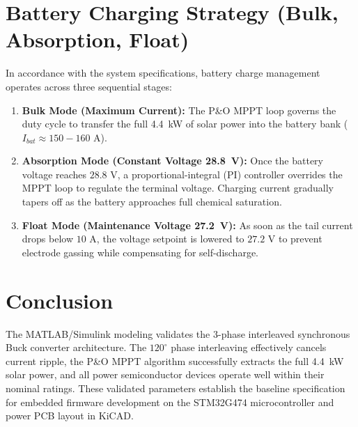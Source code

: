 \documentclass[11pt, a4paper]{article}
\begin{document}
\section{Battery Charging Strategy (Bulk, Absorption, Float)}
In accordance with the system specifications, battery charge management operates across three sequential stages:
\begin{enumerate}
    \item \textbf{Bulk Mode (Maximum Current):} The P\&O MPPT loop governs the duty cycle to transfer the full 4.4~kW of solar power into the battery bank ($I_{bat} \approx 150 - 160\text{ A}$).
    \item \textbf{Absorption Mode (Constant Voltage 28.8~V):} Once the battery voltage reaches $28.8\text{ V}$, a proportional-integral (PI) controller overrides the MPPT loop to regulate the terminal voltage. Charging current gradually tapers off as the battery approaches full chemical saturation.
    \item \textbf{Float Mode (Maintenance Voltage 27.2~V):} As soon as the tail current drops below $10\text{ A}$, the voltage setpoint is lowered to $27.2\text{ V}$ to prevent electrode gassing while compensating for self-discharge.
\end{enumerate}

\section{Conclusion}
The MATLAB/Simulink modeling validates the 3-phase interleaved synchronous Buck converter architecture. The $120^\circ$ phase interleaving effectively cancels current ripple, the P\&O MPPT algorithm successfully extracts the full 4.4~kW solar power, and all power semiconductor devices operate well within their nominal ratings. These validated parameters establish the baseline specification for embedded firmware development on the STM32G474 microcontroller and power PCB layout in KiCAD.
\end{document}
